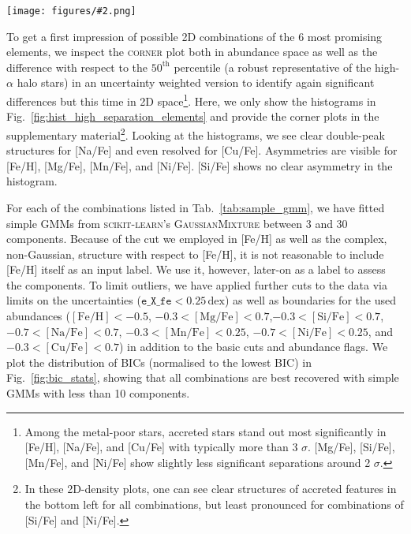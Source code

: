 \documentclass[fleqn,usenatbib]{mnras}
\newcommand{\dex}{\,\mathrm{dex}}	%
\newcommand{\codeicon}{{\faCloudDownload}}
\newcommand{\codelink}[1]{\href{https://github.com/svenbuder/Accreted-stars-in-GALAH-DR3/tree/main/figures/#1.ipynb}{\codeicon}\,\,}
\newcommand{\oscaption}[2]{\caption{#2 \codelink{#1}}}
\newcommand{\figuretextwidth}[4]{\begin{figure*} \centering \texttt{[image: figures/\#2.png]}\oscaption{#3}{#4}\label{fig:#2} \end{figure*}}
\begin{document}
\figuretextwidth{17cm}{hist_high_separation_elements}{gaussian_mixture_models}{
\textbf{Histograms of [Fe/H], [Mg/Fe], [Si/Fe], [Na/Fe], [Mn/Fe], [Ni/Fe], and [Cu/Fe] for stars with $\mathrm{[Fe/H]} < -0.6$ which passed the basic quality cuts (Eq.~\ref{eq:basic_cuts})}.
Only stars with unflagged measurements for all these elements are shown. Extensive \textsc{corner} plots are provided in the supplementary material.
}

To get a first impression of possible 2D combinations of the 6 most promising elements, we inspect the \textsc{corner} plot \citep{corner} both in abundance space as well as the difference with respect to the $50^\text{th}$ percentile (a robust representative of the high-$\alpha$ halo stars) in an uncertainty weighted version to identify again significant differences but this time in 2D space\footnote{Among the metal-poor stars, accreted stars stand out most significantly in [Fe/H], [Na/Fe], and [Cu/Fe] with typically more than 3 $\sigma$. [Mg/Fe], [Si/Fe], [Mn/Fe], and [Ni/Fe] show slightly less significant separations around 2 $\sigma$.}. Here, we only show the histograms in Fig.~\ref{fig:hist_high_separation_elements} and provide the corner plots in the supplementary material\footnote{In these 2D-density plots, one can see clear structures of accreted features in the bottom left for all combinations, but least pronounced for combinations of [Si/Fe] and [Ni/Fe].}. Looking at the histograms, we see clear double-peak structures for [Na/Fe] and even resolved for [Cu/Fe]. Asymmetries are visible for [Fe/H], [Mg/Fe], [Mn/Fe], and [Ni/Fe]. [Si/Fe] shows no clear asymmetry in the histogram.

For each of the combinations listed in Tab.~\ref{tab:sample_gmm}, we have fitted simple GMMs from \textsc{scikit-learn}'s \textsc{GaussianMixture} between 3 and 30 components. Because of the cut we employed in [Fe/H] as well as the complex, non-Gaussian, structure with respect to [Fe/H], it is not reasonable to include [Fe/H] itself as an input label. We use it, however, later-on as a label to assess the components. To limit outliers, we have applied further cuts to the data via limits on the uncertainties ($\texttt{e\_X\_fe} < 0.25\dex$) as well as boundaries for the used abundances ($ \mathrm{[Fe/H]} < -0.5 $, $-0.3 < \mathrm{[Mg/Fe]} < 0.7$,$ -0.3 < \mathrm{[Si/Fe]} < 0.7$, $ -0.7 < \mathrm{[Na/Fe]} < 0.7$, $ -0.3 < \mathrm{[Mn/Fe]} < 0.25$, $ -0.7 < \mathrm{[Ni/Fe]} < 0.25$, and $ -0.3 < \mathrm{[Cu/Fe]} < 0.7$) in addition to the basic cuts and abundance flags. We plot the distribution of BICs (normalised to the lowest BIC) in Fig.~\ref{fig:bic_stats}, showing that all combinations are best recovered with simple GMMs with less than 10 components.
\end{document}
